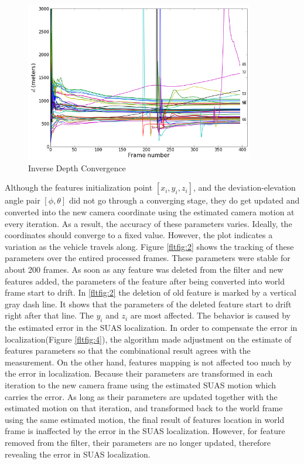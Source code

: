 \begin{figure}[h]
\centering
\includegraphics[width=10cm, keepaspectratio=true]{./Figures/fltfig/cut1/Figure10.png}
\caption{Inverse Depth Convergence}
\label{fltfig:1}
\end{figure}

Although the features initialization point $[x_i, y_i, z_i]$, and the
deviation-elevation angle pair $[\phi, \theta]$ did not go through a
converging stage, they do get updated and converted into the new
camera coordinate using the estimated camera motion at every
iteration. As a result, the accuracy of these parameters varies.
Ideally, the coordinates should converge to a fixed value. However,
the plot indicates a variation as the vehicle travels along. Figure
\ref{fltfig:2} shows the tracking of these parameters over the entired
processed frames.
These parameters were stable for about 200 frames. As soon as any
feature was deleted from the filter and new features added, the
parameters of the feature after being converted into world
frame start to drift. In \ref{fltfig:2} the deletion of old feature is
marked by a vertical gray dash line. It shows that the parameters of
the deleted feature start to drift right after that line. The $y_i$
and $z_i$ are most affected. The behavior is caused by the estimated
error in the SUAS localization. In order to compensate the error in
localization(Figure \ref{fltfig:4}), the algorithm made adjustment on the
estimate of  features parameters so that the combinational result
agrees with the measurement. On the other hand, features mapping is
not affected too much by the error in localization. Because their
parameters are transformed in each iteration to the new camera frame
using the estimated SUAS motion which carries the error. As long as
their parameters are updated together with the estimated motion on that
iteration, and transformed back to the world frame using the same
estimated motion, the final result of features location in world frame
is inaffected by the error in the SUAS localization. However, for
feature removed from the filter, their parameters are no longer
updated, therefore revealing the error in SUAS localization. 

